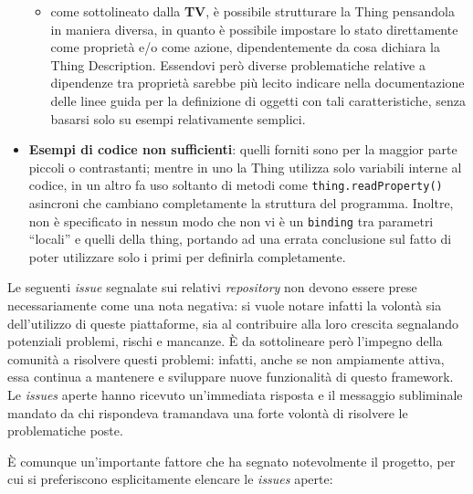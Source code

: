 \documentclass[12pt,a4paper,openright,oneside]{report}
\newcommand{\quotes}[1]{``#1''}
\begin{document}
\begin{itemize}
\begin{itemize}
			\item come sottolineato dalla \textbf{TV}, è possibile strutturare la Thing pensandola in maniera diversa, in quanto è possibile impostare lo stato direttamente come proprietà e/o come azione, dipendentemente da cosa dichiara la Thing Description. Essendovi però diverse problematiche relative a dipendenze tra proprietà sarebbe più lecito indicare nella documentazione delle linee guida per la definizione di oggetti con tali caratteristiche, senza basarsi solo su esempi relativamente semplici.
		\end{itemize}
	
	\item \textbf{Esempi di codice non sufficienti}: quelli forniti sono per la maggior parte piccoli o contrastanti; mentre in uno la Thing utilizza solo variabili interne al codice, in un altro fa uso soltanto di metodi come \texttt{thing.readProperty()} asincroni che cambiano completamente la struttura del programma. Inoltre, non è specificato in nessun modo che non vi è un \texttt{binding} tra parametri \quotes{locali} e quelli della thing, portando ad una errata conclusione sul fatto di poter utilizzare solo i primi per definirla completamente.
\end{itemize}

Le seguenti \textit{issue} segnalate sui relativi \textit{repository} non devono essere prese necessariamente come una nota negativa: si vuole notare infatti la volontà sia dell'utilizzo di queste piattaforme, sia al contribuire alla loro crescita segnalando potenziali problemi, rischi e mancanze. È da sottolineare però l'impegno della comunità a risolvere questi problemi: infatti, anche se non ampiamente attiva, essa continua a mantenere e sviluppare nuove funzionalità di questo framework. Le \textit{issues} aperte  hanno ricevuto un'immediata risposta e il messaggio subliminale mandato da chi rispondeva tramandava una forte volontà di risolvere le problematiche poste.

È comunque un'importante fattore che ha segnato notevolmente il progetto, per cui si preferiscono esplicitamente elencare le \textit{issues} aperte:
\end{document}
